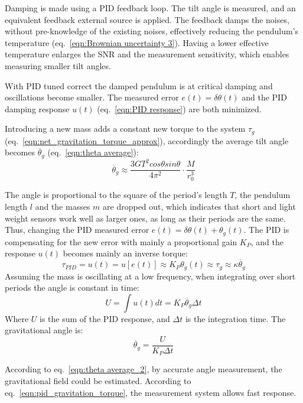 \documentclass[\main/master.tex]{subfiles}
\begin{document}
\par\noindent
Damping is made using a PID feedback loop. The tilt angle is measured, and an equivalent feedback external source is applied. The feedback damps the noises, without pre-knowledge of the existing noises, effectively reducing the pendulum's temperature (eq.~\ref{eqn:Brownian uncertainty 3}). Having a lower effective temperature enlarges the SNR and the measurement sensitivity, which enables measuring smaller tilt angles.
\par\noindent
With PID tuned correct the damped pendulum is at critical damping and oscillations become smaller. The measured error $e(t) = \delta\theta(t)$ and the PID damping response $u(t)$ (eq.~\ref{eqn:PID response}) are both minimized. 
\par\noindent
Introducing a new mass adds a constant new torque to the system $\tau_g$ (eq.~\ref{eqn:net_gravitation_torque_approx}), accordingly the average tilt angle becomes $\overline{\theta}_g$ (eq.~\ref{eqn:theta average}):
\begin{equation}
\overline{\theta}_g  \approx \frac{3GT^2cos\theta sin\theta}{4\pi^2 } \cdot \frac{M}{r_0^3}   \label{eqn:theta average_2}
\end{equation}
\par\noindent
The angle is proportional to the square of the period's length $T$, the pendulum length $l$ and the masses $m$ are dropped out, which indicates that short and light weight sensors work well as larger ones, as long as their periods are the same. Thus, changing the PID measured error $e(t) = \delta\theta(t) + \theta_g(t)$. The PID is compensating for the new error with mainly a proportional gain $K_P$, and the response $u(t)$ becomes mainly an inverse torque:
\begin{equation}
\tau_{PID} = u(t) = u[e(t)] \approx K_P\theta_g(t) \approx \tau_{g} \approx \kappa \overline{\theta}_g 
\label{eqn:PID_response}
\end{equation}
Assuming the mass is oscillating at a low frequency, when integrating over short periods the angle is constant in time:
\begin{equation}
U = \int u(t) dt = K_P\overline{\theta}_g\Delta t 
\label{eqn:PID_measurement_eqn}
\end{equation}
Where $U$ is the sum of the PID response, and $\Delta t$ is the integration time. The gravitational angle is:
\begin{equation}
\overline{\theta}_g = \frac{U}{K_P\Delta t}      \label{eqn:pid_gravitation_torque}
\end{equation}
\par\noindent
According to eq.~\ref{eqn:theta average_2}, by accurate angle measurement, the gravitational field could be estimated. According to eq.~\ref{eqn:pid_gravitation_torque}, the measurement system allows fast response. 
\end{document}

